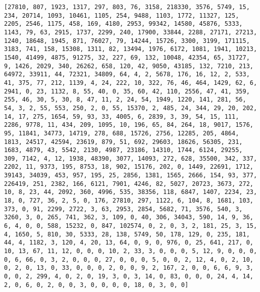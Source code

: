 \documentclass[11pt]{article}
\begin{document}
    \begin{Verbatim}[commandchars=\\\{\}]
[27810, 807, 1923, 1317, 297, 803, 76, 3158, 218330, 3576, 5749, 15, 234, 20714, 1093, 10461, 1105, 254, 9488, 1103, 1772, 11327, 125, 2205, 2546, 1175, 458, 169, 4180, 2953, 99342, 14580, 45876, 5333, 1143, 79, 63, 2915, 1737, 2299, 240, 17900, 33844, 2288, 27171, 27213, 1240, 18648, 1945, 871, 76027, 79, 14244, 15726, 3300, 3199, 171115, 3183, 741, 158, 15308, 1311, 82, 13494, 1976, 6172, 1081, 1941, 10213, 1540, 41499, 4875, 91275, 32, 227, 69, 132, 10048, 42354, 65, 31727, 9, 1426, 2029, 340, 26262, 658, 120, 42, 9050, 43185, 132, 7210, 213, 64972, 33911, 44, 72321, 34809, 64, 4, 2, 5678, 176, 16, 12, 2, 533, 41, 375, 77, 212, 1139, 4, 24, 222, 10, 322, 76, 46, 464, 1429, 62, 6, 2941, 0, 23, 1132, 8, 55, 40, 0, 35, 60, 42, 110, 2556, 47, 41, 359, 255, 46, 30, 5, 30, 8, 47, 11, 2, 24, 54, 1949, 1220, 141, 281, 56, 54, 3, 2, 55, 553, 250, 2, 0, 55, 15370, 2, 485, 24, 344, 29, 20, 202, 14, 17, 275, 1654, 59, 93, 33, 4005, 6, 2839, 3, 39, 54, 15, 111, 2286, 9778, 11, 434, 209, 1095, 10, 196, 65, 84, 264, 18, 9017, 1576, 95, 11841, 34773, 14719, 278, 688, 15726, 2756, 12285, 205, 4864, 1813, 24517, 42594, 23619, 879, 51, 692, 29603, 18626, 56305, 231, 1683, 4879, 43, 5542, 2130, 4987, 23186, 14310, 1744, 6124, 29255, 309, 7142, 4, 12, 1938, 48390, 3077, 14093, 272, 628, 35500, 342, 337, 2202, 11, 9373, 195, 8753, 18, 902, 15176, 202, 0, 1449, 22691, 1712, 39143, 34039, 453, 957, 195, 25, 2856, 1381, 1565, 2666, 154, 93, 377, 226419, 251, 2382, 166, 6121, 7901, 4246, 82, 5027, 20723, 3673, 272, 10, 8, 23, 44, 2092, 360, 4996, 535, 38356, 118, 6847, 1407, 2234, 23, 18, 0, 727, 36, 2, 5, 0, 176, 27810, 297, 1122, 6, 104, 8, 1681, 103, 373, 0, 91, 2299, 2722, 3, 63, 2953, 2854, 5682, 71, 3576, 540, 3, 3260, 3, 0, 265, 741, 362, 3, 109, 0, 40, 306, 34043, 590, 14, 9, 36, 6, 4, 0, 0, 588, 15232, 0, 847, 102574, 0, 2, 0, 3, 2, 181, 25, 3, 15, 4, 1650, 5, 810, 30, 5333, 28, 138, 5749, 50, 178, 129, 0, 235, 181, 44, 4, 1182, 3, 120, 4, 20, 13, 64, 0, 9, 0, 976, 0, 25, 641, 217, 0, 10, 13, 67, 11, 12, 0, 0, 0, 10, 2, 33, 3, 0, 0, 0, 5, 12, 9, 0, 0, 0, 0, 6, 66, 0, 3, 2, 0, 0, 0, 27, 0, 0, 0, 5, 0, 0, 2, 12, 4, 0, 2, 10, 0, 2, 0, 13, 0, 33, 0, 0, 0, 2, 0, 0, 9, 2, 167, 2, 0, 0, 6, 6, 9, 3, 0, 0, 2, 299, 4, 0, 2, 0, 19, 3, 0, 3, 14, 0, 83, 0, 0, 0, 24, 4, 14, 2, 0, 6, 0, 2, 0, 0, 3, 0, 0, 0, 0, 18, 0, 3, 0, 0]

    \end{Verbatim}
\end{document}
